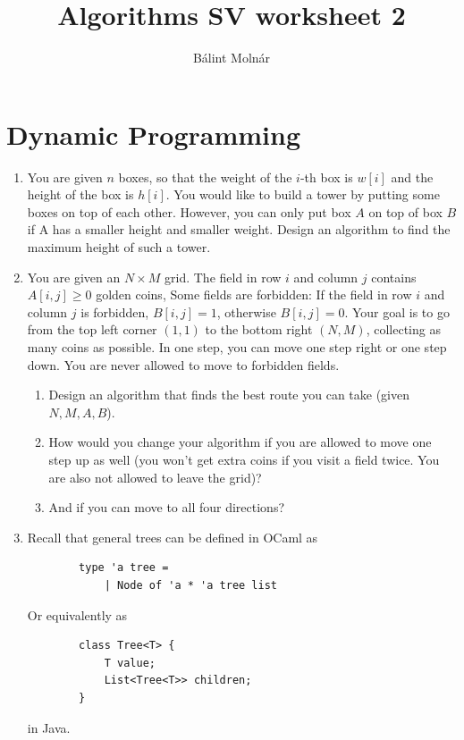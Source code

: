 \documentclass{article}
\title{{Algorithms SV worksheet 2}}
\author{Bálint Molnár}
\begin{document}
\maketitle


\section{Dynamic Programming}

\begin{enumerate}
    \item You are given $n$ boxes, so that the weight of the $i$-th box is $w[i]$ and the height of the box is $h[i]$. You would like to build a tower by putting some boxes on top of each other. However, you can only put box $A$ on top of box $B$ if A has a smaller height and smaller weight. Design an algorithm to find the maximum height of such a tower.
    \item

    You are given an $N \times M$ grid. The field in row $i$ and column $j$ contains $A[i,j]\geq0$ golden coins, Some fields are forbidden: If the field in row $i$ and column $j$ is forbidden, $B[i,j] = 1$, otherwise $B[i,j]=0$. Your goal is to go from the top left corner $(1,1)$ to the bottom right $(N,M)$, collecting as many coins as possible. In one step, you can move one step right or one step down. You are never allowed to move to forbidden fields.
    \begin{enumerate}
        \item Design an algorithm that finds the best route you can take (given $N,M,A,B$).
        \item How would you change your algorithm if you are allowed to move one step up as well (you won't get extra coins if you visit a field twice. You are also not allowed to leave the grid)?
        \item And if you can move to all four directions?
    \end{enumerate}
    
    
    \item Recall that general trees can be defined in OCaml as
    \begin{verbatim}
        type 'a tree =
            | Node of 'a * 'a tree list
    \end{verbatim}

    Or equivalently as

    \begin{verbatim}
        class Tree<T> {
            T value;
            List<Tree<T>> children;
        }
    \end{verbatim}
    in Java.


\end{enumerate}
\end{document}
